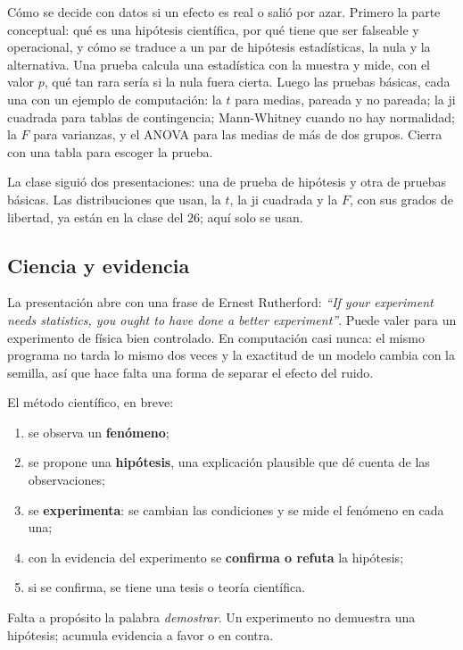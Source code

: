 \documentclass[11pt,letterpaper]{article}
\begin{document}

\begin{quick_sum}
    Cómo se decide con datos si un efecto es real o salió por azar.
    Primero la parte conceptual: qué es una hipótesis científica, por
    qué tiene que ser falseable y operacional, y cómo se traduce a un
    par de hipótesis estadísticas, la nula y la alternativa. Una prueba
    calcula una estadística con la muestra y mide, con el valor $p$,
    qué tan rara sería si la nula fuera cierta. Luego las pruebas
    básicas, cada una con un ejemplo de computación: la $t$ para
    medias, pareada y no pareada; la ji cuadrada para tablas de
    contingencia; Mann-Whitney cuando no hay normalidad; la $F$ para
    varianzas, y el ANOVA para las medias de más de dos grupos. Cierra
    con una tabla para escoger la prueba.
\end{quick_sum}

La clase siguió dos presentaciones: una de prueba de hipótesis y otra
de pruebas básicas. Las distribuciones que usan, la $t$, la ji cuadrada
y la $F$, con sus grados de libertad, ya están en la clase del $26$;
aquí solo se usan.


\subsection*{Ciencia y evidencia}

La presentación abre con una frase de Ernest Rutherford: \emph{``If
your experiment needs statistics, you ought to have done a better
experiment''}. Puede valer para un experimento de física bien
controlado. En computación casi nunca: el mismo programa no tarda lo
mismo dos veces y la exactitud de un modelo cambia con la semilla, así
que hace falta una forma de separar el efecto del ruido.

El método científico, en breve:
\begin{enumerate}[itemsep=0.2em]
    \item se observa un \textbf{fenómeno};
    \item se propone una \textbf{hipótesis}, una explicación plausible
          que dé cuenta de las observaciones;
    \item se \textbf{experimenta}: se cambian las condiciones y se mide
          el fenómeno en cada una;
    \item con la evidencia del experimento se \textbf{confirma o
          refuta} la hipótesis;
    \item si se confirma, se tiene una tesis o teoría científica.
\end{enumerate}
Falta a propósito la palabra \emph{demostrar}. Un experimento no
demuestra una hipótesis; acumula evidencia a favor o en contra.
\end{document}
